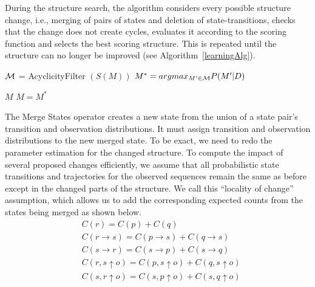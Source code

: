 \documentclass[letterpaper]{article}
\begin{document}

During the structure search, the algorithm considers every possible structure change, i.e., merging of pairs of states and deletion of state-transitions, checks that the change does not create cycles, evaluates it according to the scoring function and selects the best scoring structure. This is repeated until the structure can no longer be improved (see Algorithm~\ref{learningAlg}).

\begin{algorithm}
\footnotesize
\begin{algorithmic}

                        \State ${\cal M}$ = AcyclicityFilter $(S(M))$
			\State $M^* = argmax_{M^\prime \in {\cal M}} P(M^\prime|D)$

				\State \Return $M$
			\Else
				\State $M = M^*$
			\EndIf

		\EndWhile
	\EndProcedure
\end{algorithmic}
\caption{}
\label{learningAlg}
\end{algorithm}

The Merge States operator creates a new state from the union of a state pair's transition and observation distributions.
It must assign transition and observation distributions to the new merged
state. To be exact, we need to redo the parameter estimation for the changed
structure. To compute the impact of several proposed changes efficiently,
we assume that all probabilistic state transitions and trajectories for
the observed sequences remain the same as before except in the changed
parts of the structure. We call this ``locality of change'' assumption, which
allows us to
add the corresponding expected counts from the states being merged as shown below. %
{\footnotesize
\begin{align}
&C(r) = C(p) + C(q) \nonumber\\
&C(r \rightarrow s) = C(p \rightarrow s) +  C(q \rightarrow s) \nonumber \\
&C(s \rightarrow r) = C(s \rightarrow p) +  C(s \rightarrow q) \nonumber \\
&C(r,s \uparrow o) = C(p,s \uparrow o) +  C(q,s \uparrow o) \nonumber \\
&C(s,r \uparrow o) = C(s,p \uparrow o) +  C(s,q \uparrow o) \nonumber
\end{align}
}%
\end{document}
